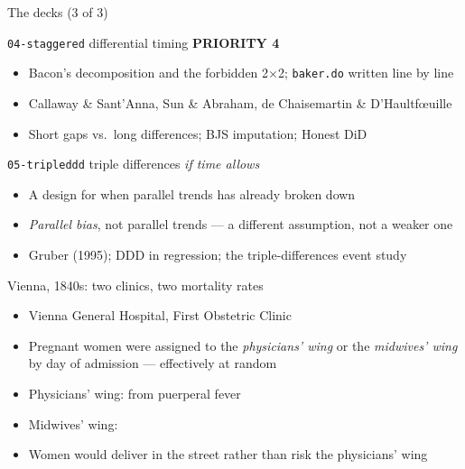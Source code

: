 \documentclass[aspectratio=169,11pt]{beamer}
\begin{document}
\begin{frame}{The decks (3 of 3)}
\vspace{0.2em}
\footnotesize
\begin{block}{\texttt{04-staggered} \;\textemdash\; differential timing \hfill \textnormal{\small\color{accent}\bfseries PRIORITY 4}}
\begin{itemize}\setlength\itemsep{0.1em}
  \item Bacon's decomposition and the forbidden 2$\times$2; \texttt{baker.do} written line by line
  \item Callaway \& Sant'Anna, Sun \& Abraham, de Chaisemartin \& D'Haultf\oe{}uille
  \item Short gaps vs.\ long differences; BJS imputation; Honest DiD
\end{itemize}
\end{block}
\vspace{0.4em}
\begin{block}{\texttt{05-tripleddd} \;\textemdash\; triple differences \hfill \textnormal{\small\color{warmgray}\itshape if time allows}}
\begin{itemize}\setlength\itemsep{0.1em}
  \item A design for when parallel trends has already broken down
  \item \textit{Parallel bias}, not parallel trends --- a different assumption, not a weaker one
  \item Gruber (1995); DDD in regression; the triple-differences event study
\end{itemize}
\end{block}
\end{frame}











\begin{frame}{Vienna, 1840s: two clinics, two mortality rates}
\vspace{0.4em}
\begin{itemize}
  \item Vienna General Hospital, First Obstetric Clinic
  \item Pregnant women were assigned to the \textit{physicians' wing} or the \textit{midwives' wing} by day of admission --- effectively at random
  \item Physicians' wing:  from puerperal fever
  \item Midwives' wing: 
  \item Women would deliver in the street rather than risk the physicians' wing
\end{itemize}
\end{frame}
\end{document}
